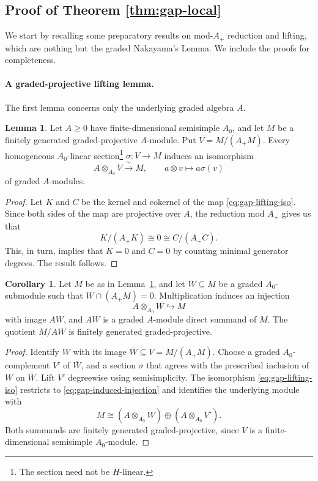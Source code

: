 \documentclass[11pt]{article}
\theoremstyle{definition}
\newtheorem{cor}[thm]{Corollary}
\newtheorem{lem}[thm]{Lemma}
\numberwithin{equation}{section}
\begin{document}
\subsection{Proof of Theorem \ref{thm:gap-local}}\label{sec:gap-proof}
 We start by recalling some preparatory results on mod-$A_+$ reduction and lifting, which are nothing but the graded Nakayama's Lemma. We include the proofs for completeness.

\paragraph{A graded-projective lifting lemma.}  
The first lemma concerns only the underlying graded algebra $A$.

\begin{lem}\label{lem:gap-lifting}
Let $A\ge0$ have finite-dimensional semisimple $A_0$, and let $M$ be a
finitely generated graded-projective $A$-module.  Put
$V=M/(A_+M)$.  Every homogeneous $A_0$-linear section\footnote{The section need not be $H$-linear.}
$\sigma:V\to M$ induces an isomorphism
\begin{equation}\label{eq:gap-lifting-iso}
 A\otimes_{A_0}V\xrightarrow{\ \sim\ }M,\qquad
 a\otimes v\longmapsto a\sigma(v)
\end{equation}
of graded $A$-modules.  
\end{lem}

\begin{proof}
Let $K$ and $C$ be the kernel and cokernel of the map \eqref{eq:gap-lifting-iso}. Since both sides of the map are projective over $A$, the reduction mod $A_+$ gives us that
\[
K/(A_+K)\cong 0 \cong C/(A_+C).
\]
This, in turn, implies that $K=0$ and $C=0$ by counting minimal generator degrees. The result follows. 
\end{proof}

\begin{cor}\label{cor:gap-induced-summand}
Let $M$ be as in Lemma~\ref{lem:gap-lifting}, and let $W\subseteq M$ be
a graded $A_0$-submodule such that $W\cap (A_+M)=0$.
Multiplication induces an injection
\begin{equation}\label{eq:gap-induced-injection}
 A\otimes_{A_0}W\hookrightarrow M
\end{equation}
with image $AW$, and $AW$ is a graded $A$-module direct summand of $M$.
The quotient $M/AW$ is finitely generated graded-projective.
\end{cor}

\begin{proof}
Identify $W$ with its image $\bar W\subseteq V=M/(A_+M)$.
Choose a graded $A_0$-complement $V'$ of $\bar W$, and a section
$\sigma$ that agrees with the prescribed inclusion of $W$ on
$\bar W$.  Lift $V'$ degreewise using semisimplicity.  The
isomorphism \eqref{eq:gap-lifting-iso} restricts to
\eqref{eq:gap-induced-injection} and identifies the underlying module
with
\[
 M\cong(A\otimes_{A_0}W)\oplus(A\otimes_{A_0}V').
\]
Both summands are finitely generated graded-projective, since $V$ is a
finite-dimensional semisimple $A_0$-module.
\end{proof}
\end{document}
